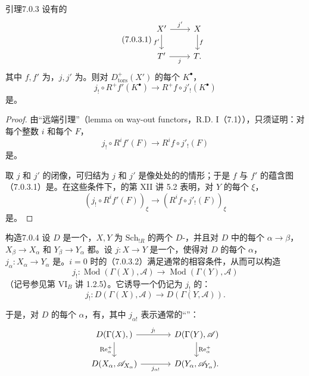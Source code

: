 \begin{SGAresult}{引理}{7.0.3}
设有的
\begin{equation}\tag{7.0.3.1}
\begin{tikzcd}
X'\arrow[r,"j'"]\arrow[d,"f'"']&X\arrow[d,"f"]\\
T'\arrow[r,"j"']&T.
\end{tikzcd}
\end{equation}
其中 $f,f'$ 为，$j,j'$ 为。则对 $D^+_{\mathrm{tors}}(X')$ 的每个 $K^\bullet$，
\[j_!\circ R^+f'(K^\bullet)\longrightarrow R^+f\circ j'_!(K^\bullet)\]
是。
\end{SGAresult}
\begin{proof}
由“远端引理”（lemma on way-out functors，R.D. I（7.1）），只须证明：对每个整数 $i$ 和每个 $F$，
\begin{equation}\tag{7.0.3.2}
j_!\circ R^if'(F)\longrightarrow R^if\circ j'_!(F)
\end{equation}
是。

取 $j$ 和 $j'$ 的闭像，可归结为 $j$ 和 $j'$ 是像处处的的情形；于是 $f$ 与 $f'$ 的蕴含图（7.0.3.1）是。在这些条件下，的第 XII 讲 5.2 表明，对 $Y$ 的每个 $\xi$，
\[(j_!\circ R^if'(F))_\xi\longrightarrow (R^if\circ j'_!(F))_\xi\]
是。
\end{proof}

\begin{SGAresult}{构造}{7.0.4}
设 $D$ 是一个，$X,Y$ 为 $\mathrm{Sch}_{!R}$ 的两个 $D$-，并且对 $D$ 中的每个 $\alpha\to\beta$， $X_\beta\to X_\alpha$ 和 $Y_\beta\to Y_\alpha$ 都。设 $j:X\to Y$ 是一个，使得对 $D$ 的每个 $\alpha$，$j_\alpha:X_\alpha\to Y_\alpha$ 是。$i=0$ 时的（7.0.3.2）满足通常的相容条件，从而可以构造
\[j_!:\operatorname{Mod}(\Gamma(X),\mathscr A)\longrightarrow\operatorname{Mod}(\Gamma(Y),\mathscr A)\]
（记号参见第 VI$_B$ 讲 1.2.5）。它诱导一个仍记为 $j_!$ 的：
\[j_!:D(\Gamma(X),\mathscr A)\longrightarrow D(\Gamma(Y,\mathscr A)).\]
\end{SGAresult}
于是，对 $D$ 的每个 $\alpha$，有，其中 $j_{\alpha!}$ 表示通常的“”：
\[
\begin{tikzcd}[column sep=large]
D(\Gamma(X),{})\arrow[r,"j_!"]\arrow[d,"\mathrm{Re}_\alpha^+"']&D(\Gamma(Y),\mathscr A)\arrow[d,"\mathrm{Re}_\alpha^+"]\\
D(X_\alpha,\mathscr A_{X_\alpha})\arrow[r,"j_{\alpha!}"']&D(Y_\alpha,\mathscr A_{Y_\alpha}).
\end{tikzcd}
\]


